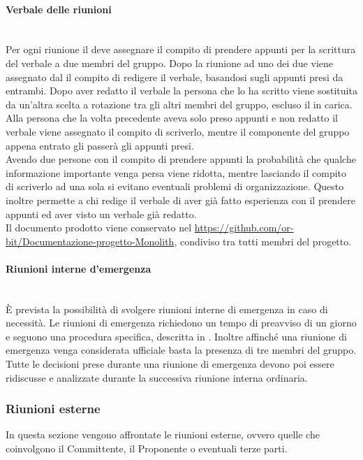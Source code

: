 \paragraph{Verbale delle riunioni}\label{sec:verbale_riunioni_interne}\mbox{}\\
Per ogni riunione il \Responsabile{} deve assegnare il compito di prendere appunti per la scrittura del verbale a due membri del gruppo. Dopo la riunione ad uno dei due viene assegnato dal \Responsabile{} il compito di redigere il verbale, basandosi sugli appunti presi da entrambi. 
Dopo aver redatto il verbale la persona che lo ha scritto viene sostituita da un’altra scelta a rotazione tra gli altri membri del gruppo, escluso il \Responsabile{} in carica. Alla persona che la volta precedente aveva solo preso appunti e non redatto il verbale viene assegnato il compito di scriverlo, mentre il componente del gruppo appena entrato gli passerà gli appunti presi.\\
Avendo due persone con il compito di prendere appunti la probabilità che qualche informazione importante venga persa viene ridotta, mentre lasciando il compito di scriverlo ad una sola si evitano eventuali problemi di organizzazione.
Questo inoltre permette a chi redige il verbale di aver già fatto esperienza con il prendere appunti ed aver visto un verbale già redatto.\\
Il documento prodotto viene conservato nel  \url{https://github.com/or-bit/Documentazione-progetto-Monolith}, condiviso tra tutti membri del progetto.

\paragraph{Riunioni interne d'emergenza}\label{sec:riunioni_emergenza}\mbox{}\\
\`{E} prevista la possibilità di svolgere riunioni interne di emergenza in caso di necessità. Le riunioni di emergenza richiedono un tempo di preavviso di un giorno e seguono una procedura specifica, descritta in . Inoltre affinché una riunione di emergenza venga considerata ufficiale basta la presenza di tre membri del gruppo.\\
Tutte le decisioni prese durante una riunione di emergenza devono poi essere ridiscusse e analizzate durante la successiva riunione interna ordinaria.

\subsubsection{Riunioni esterne}
In questa sezione vengono affrontate le riunioni esterne, ovvero quelle che coinvolgono il Committente, il Proponente o eventuali terze parti.

